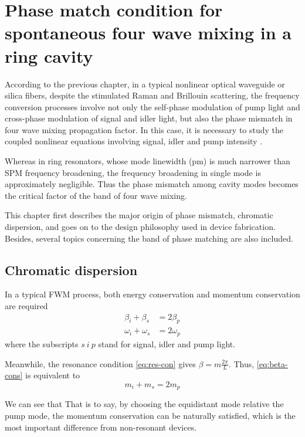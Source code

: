 
\chapter{Phase match condition for spontaneous four wave mixing in a ring cavity }\label{chap:pmc-sfwm}

According to the previous chapter, in a typical nonlinear optical waveguide or silica fibers, despite the stimulated Raman and Brillouin scattering, the frequency conversion processes involve not only the self-phase modulation of pump light and cross-phase modulation of signal and idler light, but also the phase mismatch in four wave mixing propagation factor. In this case, it is necessary to study the coupled nonlinear equations involving signal, idler and pump intensity \cite{AGRAWAL2013397}. 

Whereas in ring resonators, whose mode linewidth (pm) is much narrower than SPM frequency broadening, 
the frequency broadening in single mode is approximately negligible. 
Thus the phase mismatch among cavity modes becomes the critical factor of the band of four wave mixing.

This chapter first describes the major origin of phase mismatch, chromatic dispersion, and goes on to the design philosophy used in device fabrication. Besides, several topics concerning the band of phase matching are also included.

\section{Chromatic dispersion}

In a typical FWM process, both energy conservation and momentum conservation are required 
\begin{align}
  \beta_i + \beta_s & = 2 \beta_p \label{eq:beta-cons} \\
  \omega_i + \omega_s & = 2 \omega_p \label{eq:omega-cons}
\end{align}
where the subscripts $s~i~p$ stand for signal, idler and pump light.

Meanwhile, the resonance condition \autoref{eq:res-con} gives $\beta = m \frac{2 \pi}{L}$. Thus, \autoref{eq:beta-cons} is equivalent to 
\begin{equation}\label{eq:mu-cons}
  m_i + m_s = 2 m_p 
\end{equation} 
  
We can see that  That is to say, by choosing the equidistant mode relative the pump mode, the momentum conservation can be naturally satisfied, which is the most important difference from non-resonant devices.

